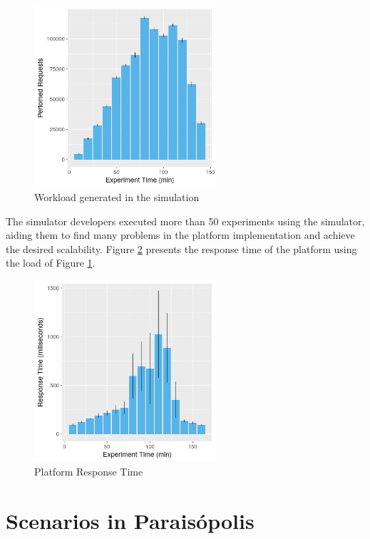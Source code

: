 \begin{figure}[!htb]
\centering
\includegraphics[width=0.6\textwidth]{figuras/chap-uses/load_mean.png}
\caption{Workload generated in the simulation}
\label{fig:workload_interscity}
\end{figure}

The simulator developers executed more than 50 experiments using the simulator, aiding them to find many problems in the platform implementation and achieve the desired scalability. Figure \ref{fig:response_time_interscity} presents the response time of the platform using the load of Figure \ref{fig:workload_interscity}. 

\begin{figure}[!htb]
\centering
\includegraphics[width=0.6\textwidth]{figuras/chap-uses/response_time_mean.png}
\caption{Platform Response Time}
\label{fig:response_time_interscity}
\end{figure}



\section{Scenarios in Paraisópolis}
\label{sec:paraisopolis}

